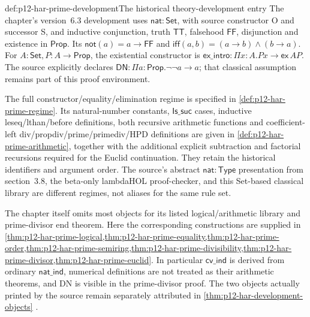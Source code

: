 \begin{hbdefinition}{def:p12-har-prime-development}{The historical theory-development entry}
The chapter's version~6.3 development uses
\(\mathsf{nat}:\mathsf{Set}\), with source constructor O and successor S,
and inductive conjunction, truth \(\mathsf{TT}\), falsehood
\(\mathsf{FF}\), disjunction and existence in \(\mathsf{Prop}\).
Its \(\mathsf{not}(a)=a\to\mathsf{FF}\) and
\(\mathsf{iff}(a,b)=(a\to b)\land(b\to a)\).
For \(A:\mathsf{Set},P:A\to\mathsf{Prop}\), the existential constructor is
\(\mathsf{ex\_intro}:\Pi x:A.Px\to\mathsf{ex}\,A P\).
The source explicitly declares
\(\mathsf{DN}:\Pi a:\mathsf{Prop}.\neg\neg a\to a\);
that classical assumption remains part of this proof environment.

The full constructor/equality/elimination regime is specified in
\cref{def:p12-har-prime-regime}. Its natural-number constants,
\(\mathsf{Is\_suc}\) cases, inductive leseq/lthan/before definitions, both recursive
arithmetic functions and coefficient-left
div/propdiv/prime/primediv/HPD definitions are given in
\cref{def:p12-har-prime-arithmetic}, together with the additional explicit
subtraction and factorial recursions required for the Euclid continuation.
They retain the historical identifiers and argument order.
The source's abstract \(\mathsf{nat}:\mathsf{Type}\) presentation from
section~3.8, the beta-only lambdaHOL proof-checker, and this Set-based
classical library are different regimes, not aliases for the same rule set.

The chapter itself omits most objects for its listed logical/arithmetic
library and prime-divisor end theorem. Here the corresponding constructions
are supplied in
\cref{thm:p12-har-prime-logical,thm:p12-har-prime-equality,thm:p12-har-prime-order,thm:p12-har-prime-semiring,thm:p12-har-prime-divisibility,thm:p12-har-prime-divisor,thm:p12-har-prime-euclid}.
In particular \(\mathsf{cv\_ind}\) is derived from ordinary \(\mathsf{nat\_ind}\), numerical
definitions are not treated as their arithmetic theorems, and DN is
visible in the prime-divisor proof. The two objects actually printed
by the source remain separately attributed in
\cref{thm:p12-har-development-objects}
\cite[pp.~1215--1220]{BarendregtGeuvers2001}.
\end{hbdefinition}



